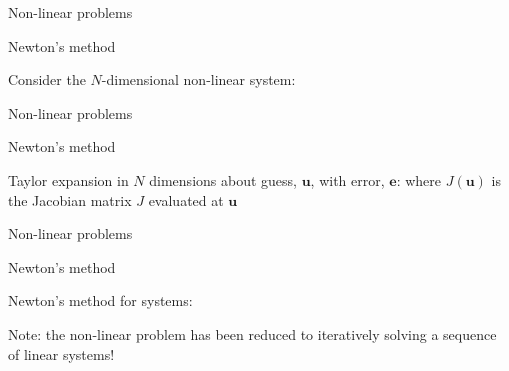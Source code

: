 \documentclass[18pt,xcolor=table]{beamer}
\begin{document}
\begin{frame}{Non-linear problems}
\begin{block}{Newton's method}
\bit
\item Consider the $N$-dimensional non-linear system:
\eit
\end{block}
\end{frame}

\begin{frame}{Non-linear problems}
\begin{block}{Newton's method}
\bit
\item Taylor expansion in $N$ dimensions about guess, $\mathbf{u}$, with error, $\mathbf{e}$:
where $J(\mathbf{u})$ is the Jacobian matrix $J$ evaluated at $\mathbf{u}$
\eit
\end{block}
\end{frame}

\begin{frame}{Non-linear problems}
\begin{block}{Newton's method}
\bit
\item Newton's method for systems:
\item Note: the non-linear problem has been reduced to iteratively solving a sequence of linear systems!
\eit
\end{block}
\end{frame}
\end{document}
